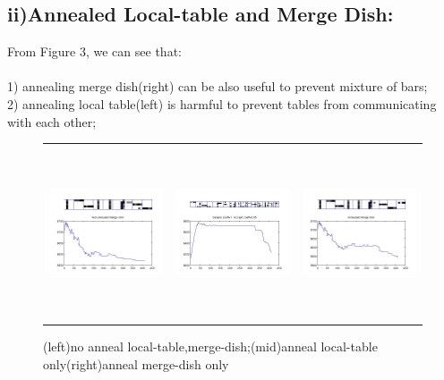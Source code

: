 \documentclass{article}
\begin{document}
\begin{spacing}{1.1}
\subsection{ii)Annealed Local-table and Merge Dish:}
From Figure 3, we can see that:\\ \\
1) annealing merge dish(right) can be also useful to prevent mixture of bars;\\
2) annealing local table(left) is harmful to prevent tables from communicating with each other;\\
\begin{figure}
 \centering
   \begin{tabular}{ccc}    
     \includegraphics[width=2in,height=2in]{not_anneal_md.jpg} &
     \includegraphics[width=2in,height=2in]{anneal_lt.jpg} &
     \includegraphics[width=2in,height=2in]{anneal_md.jpg} \\
   \end{tabular}
    \caption{(left)no anneal local-table,merge-dish;(mid)anneal local-table only(right)anneal merge-dish only}
    \label{fig:by:table} 
\end{figure}


\end{spacing}
\end{document}
